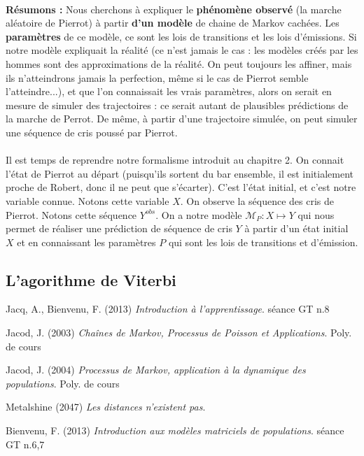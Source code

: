 \documentclass{article}
\begin{document}
\\
\textbf{Résumons :} Nous cherchons à expliquer le \textbf{phénomène observé} (la marche aléatoire de Pierrot) à partir \textbf{d'un modèle} de chaine de Markov cachées. Les \textbf{paramètres} de ce modèle, ce sont les lois de transitions et les lois d'émissions. Si notre modèle expliquait la réalité (ce n'est jamais le cas : les modèles créés par les hommes sont des approximations de la réalité. On peut toujours les affiner, mais ils n'atteindrons jamais la perfection, même si le cas de Pierrot semble l'atteindre...), et que l'on connaissait les vrais paramètres, alors on serait en mesure de simuler des trajectoires : ce serait autant de plausibles prédictions de la marche de Perrot. De même, à partir d'une trajectoire simulée, on peut simuler une séquence de cris poussé par Pierrot.\\
\\
Il est temps de reprendre notre formalisme introduit au chapitre 2. On connait l'état de Pierrot au départ (puisqu'ils sortent du bar ensemble, il est initialement proche de Robert, donc il ne peut que s'écarter). C'est l'état initial, et c'est notre variable connue. Notons cette variable $X$. On observe la séquence des cris de Pierrot. Notons cette séquence $Y^{obs}$. On a notre modèle $\mathcal{M}_P:X \mapsto Y$ qui nous permet de réaliser une prédiction de séquence de cris $Y$ à partir d'un état initial $X$ et en connaissant les paramètres $P$ qui sont les lois de transitions et d'émission. 

\subsection{L'agorithme de Viterbi}
\newpage
\begin{thebibliography}{9}

  Jacq, A., Bienvenu, F. (2013)
  \emph{Introduction à l'apprentissage}.
  séance GT n.8
  
  Jacod, J. (2003)
  \emph{Cha\^ines de Markov, Processus de Poisson et Applications}.
  Poly. de cours
  
  Jacod, J. (2004)
  \emph{Processus de Markov, application à la dynamique des populations}.
  Poly. de cours

  Metalshine (2047)
  \emph{Les distances n'existent pas}.
  
  Bienvenu, F. (2013)
  \emph{Introduction aux modèles matriciels de populations}.
  séance GT n.6,7
  
  
\end{thebibliography}
\end{document}
